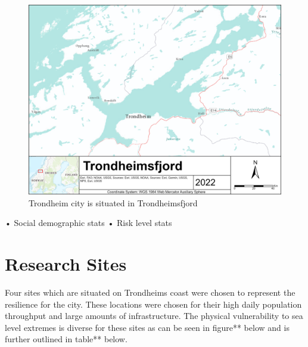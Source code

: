 \begin{figure} [h]
    \centering
    \includegraphics[width=1.0\textwidth]{fig/Trondheimsfjord.png}
    \caption{Trondheim city is situated in Trondheimsfjord}
    \label{fig:research area Trondheim}
\end{figure}

•	Social demographic stats
•	Risk level stats

\section{Research Sites}
Four sites which are situated on Trondheims coast were chosen to represent the resilience for the city. These locations were chosen for their high daily population throughput and large amounts of infrastructure. The physical vulnerability to sea level extremes is diverse for these sites as can be seen in figure** below and is further outlined in table** below. 
\paragraph{}

